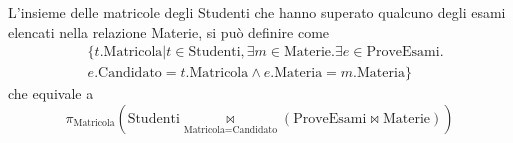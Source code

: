 \begin{example}
	L’insieme delle matricole degli Studenti che hanno superato qualcuno degli esami elencati nella relazione Materie, si può definire come
	\begin{align*}
		& \{t.\text{Matricola} \vert t \in \text{Studenti}, \exists m \in \text{Materie}. \exists e \in \text{ProveEsami}.\\
		& e.\text{Candidato}=t.\text{Matricola} \land e.\text{Materia} = m.\text{Materia}\}
	\end{align*}
	che equivale a
	\begin{equation*}
		\pi_{\text{Matricola}}(\text{Studenti} \underset{\text{Matricola} = \text{Candidato}}{\Join}(\text{ProveEsami} \Join \text{Materie}))
	\end{equation*}
\end{example}